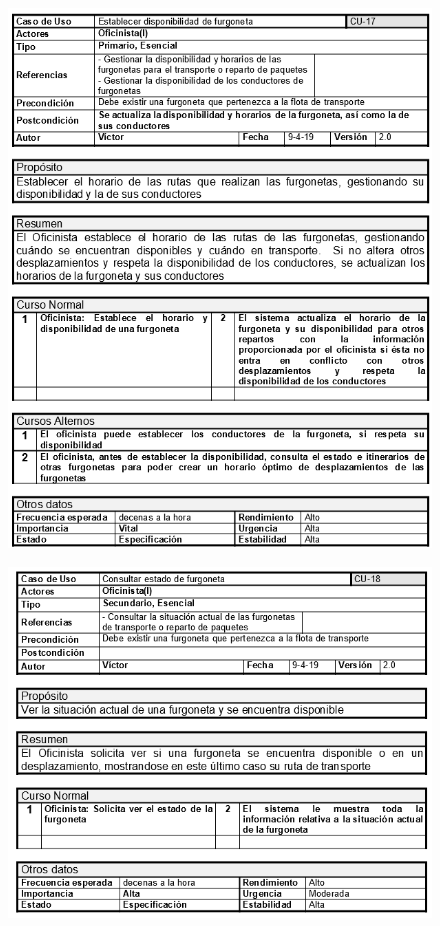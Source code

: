 \begin{figure}[H]
	\centering
	\includegraphics[width=16cm]{17}
\end{figure}
\begin{figure}[H]
	\centering
	\includegraphics[width=16cm]{18}
\end{figure}
